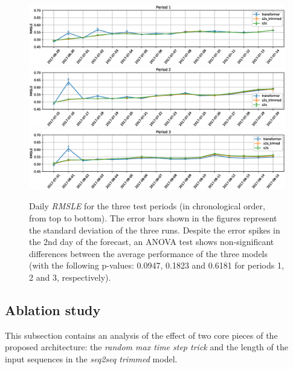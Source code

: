 \begin{figure}
\centering
\includegraphics[width=1\linewidth]{salesforecast/images/lag3_daily_error}
\includegraphics[width=1\linewidth]{salesforecast/images/lag2_daily_error}
\includegraphics[width=1\linewidth]{salesforecast/images/lag1_daily_error}
\caption[Daily sales \textit{RMSLE} for the three test periods]{Daily \textit{RMSLE} for the three test periods (in chronological order, from top to bottom). The error bars shown in the figures represent the standard deviation of the three runs. Despite the error spikes in the 2nd day of the forecast, an ANOVA test shows non-significant differences between the average performance of the three models (with the following p-values: 0.0947, 0.1823 and 0.6181 for periods 1, 2 and 3, respectively). }
\label{fig:dailyerror}
\end{figure}


\subsection{Ablation study}
This subsection contains an analysis of the effect of two core pieces of the proposed architecture: the \textit{random max time step trick} and the length of the  input sequences in the \textit{seq2seq trimmed} model.

